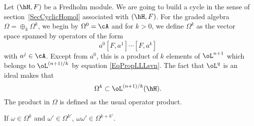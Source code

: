 Let $(\hH,F)$ be a Fredholm module. We are going to build a cycle in the sense of section~\ref{SecCyclicHomol} associated with $(\hH,F)$. For the graded algebra $\Omega=\oplus_k\Omega^k$, we begin by $\Omega^0=\cA$ and for $k>0$, we define $\Omega^k$ as the vector space spanned by operators of the form
\[
	a^0[F,a^1]\cdots[F,a^k]
\]
with $a^{j}\in\cA$. Except from $a^0$, this is a product of $k$ elements of $\oL^{n+1}$ which belongs to $\oL^{(n+1)/k}$ by equation \eqref{EqPropLLLsvn}. The fact that $\oL^q$ is an ideal makes that
\[
	\Omega^k\subset\oL^{(n+1)/k}(\hH).
\]
The product in $\Omega$ is defined as the usual operator product.

\begin{lemma}
	If $\omega\in\Omega^k$ and $\omega'\in\Omega^{k'}$, $\omega\omega'\in\Omega^{k+k'}$.
\end{lemma}

